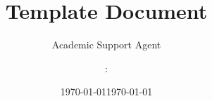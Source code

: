 \documentclass{article}
\title{Template Document}
\author{Academic Support Agent}
\date{\today}
\begin{document}
\maketitle

\rightskip\rightmargin

\title{    \\
\textcolor{yellow}{     }}

\author{  :    }
\institute{  :            }
\date{\today}

\begin{frame}
\maketitle
\end{frame}

\begin{frame}{ }

\end{frame}



\section{       }
\end{document}
